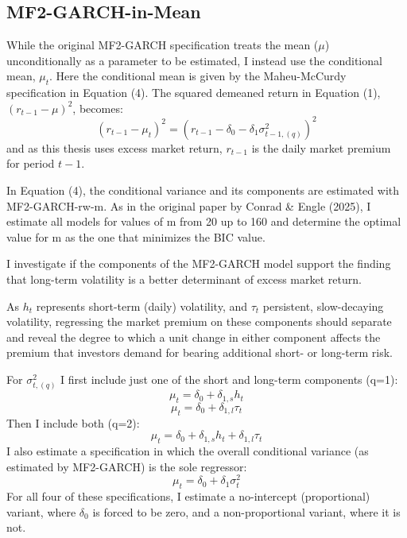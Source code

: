 \documentclass[12pt]{article}
\begin{document}
\subsection{MF2-GARCH-in-Mean}
While the original MF2-GARCH specification treats the mean ($\mu$) unconditionally as a parameter to be estimated, I instead use the conditional mean, $\mu_t$. Here the conditional mean is given by the Maheu-McCurdy specification in Equation (4). The squared demeaned return in Equation (1), $(r_{t-1}-\mu)^2$, becomes:
\begin{equation}
\nonumber
(r_{t-1}-\mu_t)^2=(r_{t-1}-\delta_0-\delta_1\sigma_{t-1,(q)}^2)^2
\end{equation}
and as this thesis uses excess market return, $r_{t-1}$ is the daily market premium for period $t-1$.\par
In Equation (4), the conditional variance and its components are estimated with MF2-GARCH-rw-m. As in the original paper by Conrad \& Engle (2025), I estimate all models for values of m from 20 up to 160 and determine the optimal value for m as the one that minimizes the BIC value.\par
I investigate if the components of the MF2-GARCH model support the finding that long-term volatility is a better determinant of excess market return.\par
As $h_t$ represents short-term (daily) volatility, and $\tau_t$ persistent, slow-decaying volatility, regressing the market premium on these components should separate and reveal the degree to which a unit change in either component affects the premium that investors demand for bearing additional short- or long-term risk.\par 
\noindent For $\sigma_{t,(q)}^2$ I first include just one of the short and long-term components (q=1):
\begin{equation}
\nonumber
\mu_t=\delta_0+\delta_{1,s}h_t
\end{equation}
\begin{equation}
\nonumber
\mu_t=\delta_0+\delta_{1,l}\tau_t
\end{equation}
Then I include both (q=2):
\begin{equation}
\nonumber
\mu_t=\delta_0+\delta_{1,s}h_t+\delta_{1,l}\tau_t
\end{equation}
I also estimate a specification in which the overall conditional variance (as estimated by MF2-GARCH) is the sole regressor:
\begin{equation}
\nonumber
\mu_t=\delta_0+\delta_1\sigma_t^2
\end{equation}
For all four of these specifications, I estimate a no-intercept (proportional) variant, where $\delta_0$ is forced to be zero, and a non-proportional variant, where it is not.
\end{document}
